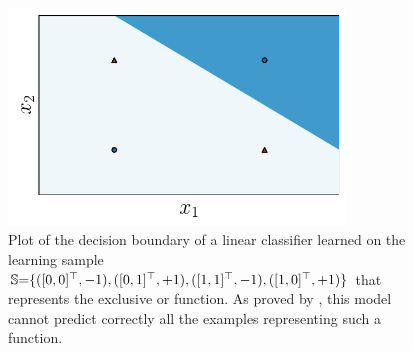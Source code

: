 \begin{figure}
    \centering
    \includegraphics[width=0.8\textwidth]{chapter_1/figures/xor.pdf}
    \caption[Plot of the Exclusive Or Function]{
    Plot of the decision boundary of a linear classifier learned on the learning sample $\S{=}\{([0, 0]^\top, -1), ([0, 1]^\top, +1), ([1, 1]^\top, -1), ([1, 0]^\top, +1)\}$ that  represents the exclusive or function. 
    As proved by \citet{MinskyPapert1972}, this model cannot predict correctly all the examples representing such a function.
    }
    \label{chap:intro:fig:xor}
\end{figure}

